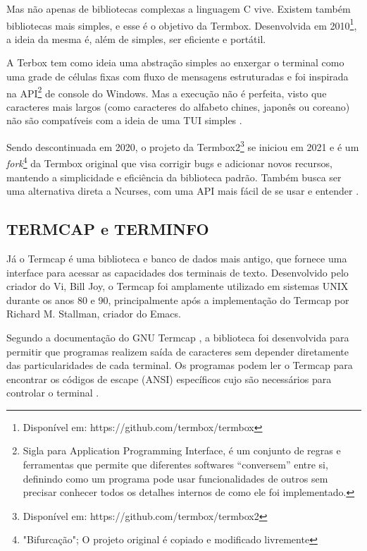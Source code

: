 Mas não apenas de bibliotecas complexas a linguagem C vive. Existem também
bibliotecas mais simples, e esse é o objetivo da Termbox. Desenvolvida em 2010\footnote{Disponível
em: https://github.com/termbox/termbox}, a ideia da mesma é, além de simples,
ser eficiente e portátil.

A Terbox tem como ideia uma abstração simples ao enxergar o terminal como uma
grade de células fixas com fluxo de mensagens estruturadas e foi inspirada na
API\footnote{Sigla para Application Programming Interface, é um conjunto de regras
e ferramentas que permite que diferentes softwares “conversem” entre si,
definindo como um programa pode usar funcionalidades de outros sem precisar
conhecer todos os detalhes internos de como ele foi implementado.} de console do
Windows. Mas a execução não é perfeita, visto que caracteres mais largos (como
caracteres do alfabeto chines, japonês ou coreano) não são compatíveis com a
ideia de uma TUI simples \cite{termbox_googlecode}.

\vspace{0.4cm}

\vspace{0.4cm}

Sendo descontinuada em 2020, o projeto da Termbox2\footnote{Disponível em: https://github.com/termbox/termbox2}
se iniciou em 2021 e é um \textit{fork}\footnote{"Bifurcação"; O projeto original
é copiado e modificado livremente} da Termbox original que visa corrigir bugs e adicionar
novos recursos, mantendo a simplicidade e eficiência da biblioteca padrão. Também
busca ser uma alternativa direta a Ncurses, com uma API mais fácil de se usar e
entender \cite{termbox2_github}.

\vspace{0.4cm}

\vspace{0.4cm}

\subsection{TERMCAP e TERMINFO}

Já o Termcap é uma biblioteca e banco de dados mais antigo, que fornece uma interface
para acessar as capacidades dos terminais de texto. Desenvolvido pelo criador do
Vi, Bill Joy, o Termcap foi amplamente utilizado em sistemas UNIX durante os
anos 80 e 90, principalmente após a implementação do Termcap por Richard M.
Stallman, criador do Emacs.

Segundo a documentação do GNU Termcap \cite{stallman_termcap}, a biblioteca foi
desenvolvida para permitir que programas realizem saída de caracteres sem
depender diretamente das particularidades de cada terminal. Os programas podem ler
o Termcap para encontrar os códigos de escape (ANSI) específicos cujo são necessários
para controlar o terminal \cite{kerrisk_termcap_man7}.

